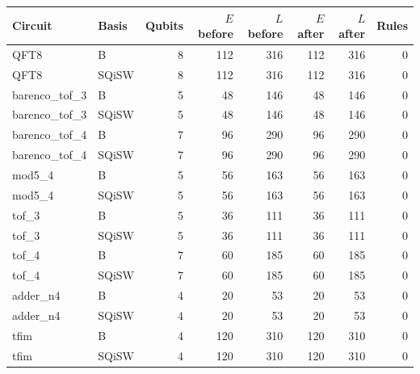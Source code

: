 \begin{center}\small\begin{tabular}{llrrrrrr}\toprule
Circuit & Basis & Qubits & $E$ before & $L$ before & $E$ after & $L$ after & Rules\\\midrule
QFT8 & B & 8 & 112 & 316 & 112 & 316 & 0\\
QFT8 & SQiSW & 8 & 112 & 316 & 112 & 316 & 0\\
barenco\_tof\_3 & B & 5 & 48 & 146 & 48 & 146 & 0\\
barenco\_tof\_3 & SQiSW & 5 & 48 & 146 & 48 & 146 & 0\\
barenco\_tof\_4 & B & 7 & 96 & 290 & 96 & 290 & 0\\
barenco\_tof\_4 & SQiSW & 7 & 96 & 290 & 96 & 290 & 0\\
mod5\_4 & B & 5 & 56 & 163 & 56 & 163 & 0\\
mod5\_4 & SQiSW & 5 & 56 & 163 & 56 & 163 & 0\\
tof\_3 & B & 5 & 36 & 111 & 36 & 111 & 0\\
tof\_3 & SQiSW & 5 & 36 & 111 & 36 & 111 & 0\\
tof\_4 & B & 7 & 60 & 185 & 60 & 185 & 0\\
tof\_4 & SQiSW & 7 & 60 & 185 & 60 & 185 & 0\\
adder\_n4 & B & 4 & 20 & 53 & 20 & 53 & 0\\
adder\_n4 & SQiSW & 4 & 20 & 53 & 20 & 53 & 0\\
tfim & B & 4 & 120 & 310 & 120 & 310 & 0\\
tfim & SQiSW & 4 & 120 & 310 & 120 & 310 & 0\\
\bottomrule\end{tabular}\end{center}
